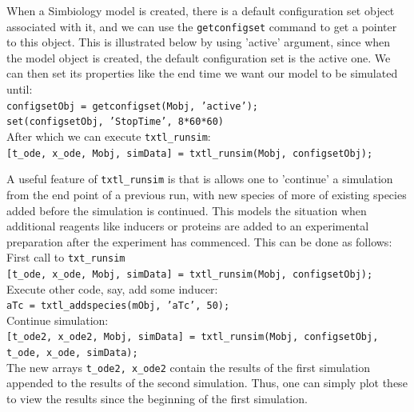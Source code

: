 \documentclass[english]{report}
\begin{document}
			\vspace{1\baselineskip}
			When a Simbiology model is created, there is a default configuration set object associated with it, and we can use the \texttt{getconfigset} command to get a pointer to this object. This is illustrated below by using 'active' argument, since when the model object is created, the default configuration set is the active one. We can then set its properties like the end time we want our model to be simulated until: \\
\texttt{configsetObj = getconfigset(Mobj, 'active');} \\
\texttt{set(configsetObj, 'StopTime', 8*60*60)} \\

After which we can execute \texttt{txtl\_runsim}: \\
\texttt{[t\_ode, x\_ode, Mobj, simData] = txtl\_runsim(Mobj, configsetObj);} 

\vspace{1\baselineskip}
A useful feature of \texttt{txtl\_runsim} is that is allows one to 'continue' a simulation from the end point of a previous run, with new species of more of existing species added before the simulation is continued. This models the situation when additional reagents like inducers or proteins are added to an experimental preparation after the experiment has commenced. This can be done as follows: \\

First call to \texttt{txt\_runsim} \\
\texttt{[t\_ode, x\_ode, Mobj, simData] = txtl\_runsim(Mobj, configsetObj);} \\

Execute other code, say, add some inducer: \\
\texttt{aTc = txtl\_addspecies(mObj, 'aTc', 50);}\\

Continue simulation:\\
\texttt{[t\_ode2, x\_ode2, Mobj, simData] = txtl\_runsim(Mobj, configsetObj, t\_ode, x\_ode, simData);} \\

The new arrays \texttt{t\_ode2, x\_ode2} contain the results of the first simulation appended to the results of the second simulation. Thus, one can simply plot these to view the results since the beginning of the first simulation. 
\end{document}
